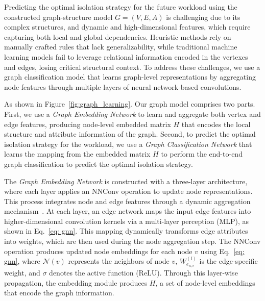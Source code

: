 {
\color{blue}
Predicting the optimal isolation strategy for the future workload using the constructed graph-structure model $G=(V, E, A)$ is challenging due to its complex structures, and dynamic and high-dimensional features, which require capturing both local and global dependencies. Heuristic methods rely on manually crafted rules that lack generalizability, while traditional machine learning models fail to leverage relational information encoded in the vertexes and edges, losing critical structural context. To address these challenges, we use a graph classification model that learns graph-level representations by aggregating node features through multiple layers of neural network-based convolutions.

As shown in Figure~\ref{fig:graph_learning}. Our graph model comprises two parts. First, we use a \textit{Graph Embedding Network} to learn and aggregate both vertex and edge features, producing node-level embedded matrix $H$ that encodes the local structure and attribute information of the graph. Second, to predict the optimal isolation strategy for the workload, we use a \textit{Graph Classification Network} that learns the mapping from the embedded matrix $H$ to perform the end-to-end graph classification to predict the optimal isolation strategy.

The \textit{Graph Embedding Network} is constructed with a three-layer architecture, where each layer applies an NNConv operation to update node representations. This process integrates node and edge features through a dynamic aggregation mechanism~\cite{DBLP:journals/pvldb/ZhouSLF20,DBLP:conf/pkdd/FurutaniSAHA19}. At each layer, an edge network maps the input edge features into higher-dimensional convolution kernels via a multi-layer perception (MLP), as shown in Eq.~\ref{eq: gnn}. This mapping dynamically transforms edge attributes into weights, which are then used during the node aggregation step. The NNConv operation produces updated node embeddings for each node $v$ using Eq.~\ref{eq: gnn}, where $\mathcal{N}(v)$ represents the neighbors of node $v$, $W^{(l)}_{e_{u,v}}$ is the edge-specific weight, and $\sigma$ denotes the active function (ReLU). Through this layer-wise propagation, the embedding module produces $H$, a set of node-level embeddings that encode the graph information.

}
